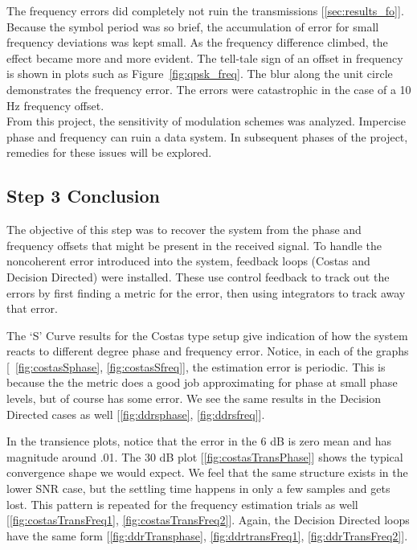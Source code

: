 \documentclass[]{article}
\begin{document}
The frequency errors did completely not ruin the transmissions [\ref{sec:results_fo}].  Because the symbol period was so brief, the accumulation of error for small frequency deviations was kept small.  As the frequency difference climbed, the effect became more and more evident.  The tell-tale sign of an offset in frequency is shown in plots such as Figure~\ref{fig:qpsk_freq}.  The blur along the unit circle demonstrates the frequency error.  The errors were catastrophic in the case of a 10 Hz frequency offset.  \\

From this project, the sensitivity of modulation schemes was analyzed.  Impercise phase and frequency can ruin a data system.  In subsequent phases of the project, remedies for these issues will be explored.



\subsection{Step 3 Conclusion}
\label{sec:conc}

The objective of this step was to recover the system from the phase and frequency offsets that might be present in the received signal. To handle the noncoherent error introduced into the system, feedback loops (Costas and Decision Directed) were installed. These use control feedback to track out the errors by first finding a metric for the error, then using integrators to track away that error. 

The `S' Curve results for the Costas type setup give indication of how the system reacts to different degree phase and frequency error.  Notice, in each of the graphs [~\ref{fig:costasSphase}, \ref{fig:costasSfreq}], the estimation error is periodic.  This is because the the metric does a good job approximating for phase at small phase levels, but of course has some error.  We see the same results in the Decision Directed cases as well [\ref{fig:ddrsphase}, \ref{fig:ddrsfreq}].

In the transience plots, notice that the error in the 6 dB is zero mean and has magnitude around .01.  The 30 dB plot [\ref{fig:costasTransPhase}]  shows the typical convergence shape we would expect.  We feel that the same structure exists in the lower SNR case, but the settling time happens in only a few samples and gets lost.  This pattern is repeated for the frequency estimation trials as well [\ref{fig:costasTransFreq1}, \ref{fig:costasTransFreq2}].  Again, the Decision Directed loops have the same form [\ref{fig:ddrTransphase}, \ref{fig:ddrtransFreq1}, \ref{fig:ddrTransFreq2}].
\end{document}
